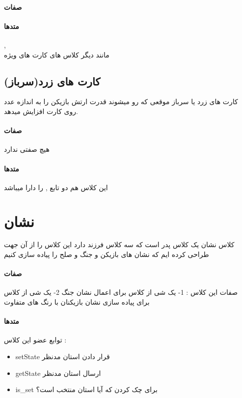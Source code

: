 \documentclass[pdf,titlepage,a4paper]{report}
\begin{document}
	\paragraph{صفات}
	\paragraph{متدها}
	 ,  \\
	مانند دیگر کلاس های کارت های ویژه

	\subsection{کارت های زرد(سرباز)}
	کارت های زرد یا سرباز موقعی که رو میشوند قدرت ارتش بازیکن را به اندازه عدد روی کارت افزایش میدهد.

	\paragraph{صفات}
	هیچ صفتی ندارد 
	\paragraph{متدها}
	این کلاس هم دو تابع  ,  را دارا میباشد
	\newpage
	
	\section{نشان}
	کلاس نشان یک کلاس پدر است که سه کلاس فرزند دارد این کلاس را از آن جهت طراحی کرده ایم که نشان های بازیکن و جنگ و صلح را پیاده سازی کنیم
	\paragraph{صفات}
     صفات این کلاس :
	 1- یک شی از کلاس   برای اعمال نشان جنگ
	 2- یک شی از کلاس  برای پیاده سازی نشان بازیکنان با رنگ های متفاوت
	\paragraph{متدها}
	 توابع عضو این کلاس :
	 \begin{latin}
		\begin{itemize}
			\item setState قرار دادن استان مدنظر
	 		\item getState ارسال استان مدنظر 
	 		\item is\_set برای چک کردن که آیا استان منتخب است؟
		\end{itemize}
	 \end{latin}
	 
\end{document}
